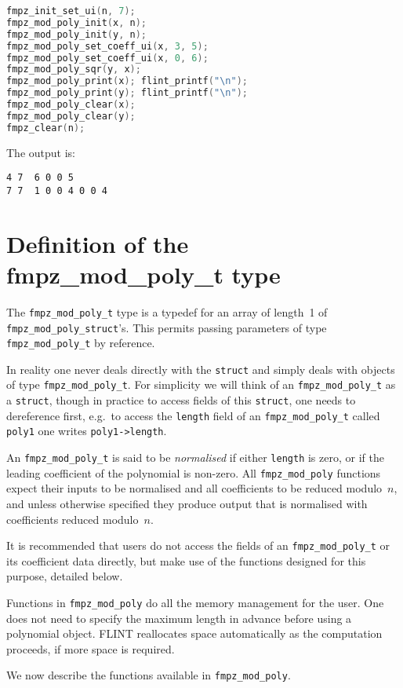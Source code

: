 \documentclass[a4paper,10pt]{book}
\newcommand{\code}{\lstinline}
\begin{document}
{{\begin{lstlisting}[language=c]
fmpz_init_set_ui(n, 7);
fmpz_mod_poly_init(x, n);
fmpz_mod_poly_init(y, n);
fmpz_mod_poly_set_coeff_ui(x, 3, 5);
fmpz_mod_poly_set_coeff_ui(x, 0, 6);
fmpz_mod_poly_sqr(y, x);
fmpz_mod_poly_print(x); flint_printf("\n");
fmpz_mod_poly_print(y); flint_printf("\n");
fmpz_mod_poly_clear(x);
fmpz_mod_poly_clear(y);
fmpz_clear(n);
\end{lstlisting}

The output is:
\begin{lstlisting}
4 7  6 0 0 5
7 7  1 0 0 4 0 0 4
\end{lstlisting}

\section{Definition of the fmpz\_mod\_poly\_t type}

The \code{fmpz_mod_poly_t} type is a typedef for an array of length~1 of\\
\code{fmpz_mod_poly_struct}'s.  This permits passing parameters of type
\code{fmpz_mod_poly_t} by reference.

In reality one never deals directly with the \code{struct} and simply deals
with objects of type \code{fmpz_mod_poly_t}.  For simplicity we will think of an
\code{fmpz_mod_poly_t} as a \code{struct}, though in practice to access fields
of this \code{struct}, one needs to dereference first, e.g.\ to access the
\code{length} field of an \code{fmpz_mod_poly_t} called \code{poly1} one writes
\code{poly1->length}.

An \code{fmpz_mod_poly_t} is said to be \emph{normalised} if either
\code{length} is zero, or if the leading coefficient of the polynomial is
non-zero.  All \code{fmpz_mod_poly} functions expect their inputs to be
normalised and all coefficients to be reduced modulo~$n$, and unless
otherwise specified they produce output that is normalised with coefficients
reduced modulo~$n$.

It is recommended that users do not access the fields of an
\code{fmpz_mod_poly_t} or its coefficient data directly, but make use of the
functions designed for this purpose, detailed below.

Functions in \code{fmpz_mod_poly} do all the memory management for the user.
One does not need to specify the maximum length in advance before using a
polynomial object.  FLINT reallocates space automatically as the computation
proceeds, if more space is required.

We now describe the functions available in \code{fmpz_mod_poly}.

}}
\end{document}
